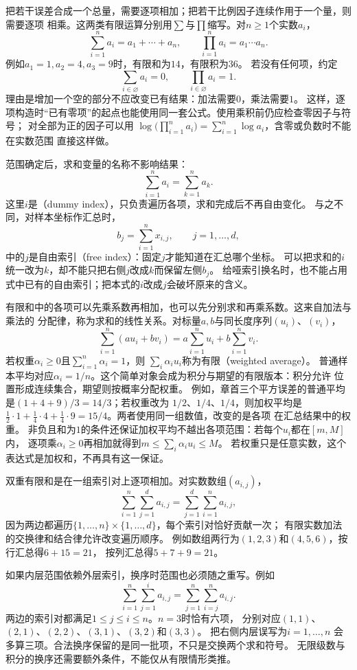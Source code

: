 把若干误差合成一个总量，需要逐项相加；把若干比例因子连续作用于一个量，则需要逐项
相乘。这两类有限运算分别用$\sum$与$\prod$缩写。对$n\geq1$个实数$a_i$，
\[
  \sum_{i=1}^{n}a_i=a_1+\cdots+a_n,\qquad
  \prod_{i=1}^{n}a_i=a_1\cdots a_n.
\]
例如$a_1=1,a_2=4,a_3=9$时，有限和为$14$，有限积为$36$。
若没有任何项，约定
\[
  \sum_{i\in\varnothing}a_i=0,\qquad
  \prod_{i\in\varnothing}a_i=1.
\]
理由是增加一个空的部分不应改变已有结果：加法需要$0$，乘法需要$1$。
这样，逐项构造时“已有零项”的起点也能使用同一套公式。使用乘积前仍应检查零因子与符号；
对全部为正的因子可以用
$\log\bigl(\prod_{i=1}^{n}a_i\bigr)=\sum_{i=1}^{n}\log a_i$，含零或负数时不能在实数范围
直接这样做。

范围确定后，求和变量的名称不影响结果：
\[
  \sum_{i=1}^{n}a_i=\sum_{k=1}^{n}a_k.
\]
这里$i$是（dummy index），只负责遍历各项，求和完成后不再自由变化。
与之不同，对样本坐标作汇总时，
\[
  b_j=\sum_{i=1}^{n}x_{i,j},\qquad j=1,\ldots,d,
\]
中的$j$是自由索引（free index）：固定$j$才能知道在汇总哪个坐标。
可以把求和的$i$统一改为$k$，却不能只把右侧$j$改成$k$而保留左侧$b_j$。
给哑索引换名时，也不能占用式中已有的自由索引；把本式的$i$改成$j$会破坏原来的含义。

有限和中的各项可以先乘系数再相加，也可以先分别求和再乘系数。这来自加法与乘法的
分配律，称为求和的线性关系。对标量$a,b$与同长度序列$(u_i)$、$(v_i)$，
\[
  \sum_{i=1}^{n}(au_i+bv_i)
  =
  a\sum_{i=1}^{n}u_i+b\sum_{i=1}^{n}v_i.
\]
若权重$\alpha_i\geq0$且$\sum_{i=1}^{n}\alpha_i=1$，则
$\sum_i\alpha_i u_i$称为有限（weighted average）。
普通样本平均对应$\alpha_i=1/n$。这个简单对象会成为积分与期望的有限版本：积分允许
位置形成连续集合，期望则按概率分配权重。
例如，章首三个平方误差的普通平均是$(1+4+9)/3=14/3$；若权重改为
$1/2$、$1/4$、$1/4$，则加权平均是
$\frac12\cdot1+\frac14\cdot4+\frac14\cdot9=15/4$。两者使用同一组数值，改变的是各项
在汇总结果中的权重。
非负且和为$1$的条件还保证加权平均不越出各项范围：若每个$u_i$都在$[m,M]$内，
逐项乘$\alpha_i\geq0$再相加就得到$m\leq\sum_i\alpha_i u_i\leq M$。
若权重只是任意实数，这个表达式是加权和，不再具有这一保证。

双重有限和是在一组索引对上逐项相加。对实数数组$(a_{i,j})$，
\[
  \sum_{i=1}^{n}\sum_{j=1}^{d}a_{i,j}
  =
  \sum_{j=1}^{d}\sum_{i=1}^{n}a_{i,j},
\]
因为两边都遍历$\{1,\ldots,n\}\times\{1,\ldots,d\}$，每个索引对恰好贡献一次；
有限实数加法的交换律和结合律允许改变遍历顺序。
例如数组两行为$(1,2,3)$和$(4,5,6)$，按行汇总得$6+15=21$，
按列汇总得$5+7+9=21$。

如果内层范围依赖外层索引，换序时范围也必须随之重写。例如
\begin{equation}
  \sum_{i=1}^{n}\sum_{j=1}^{i}a_{i,j}
  =
  \sum_{j=1}^{n}\sum_{i=j}^{n}a_{i,j}.
  \label{eq:prelim-triangular-sum}
\end{equation}
两边的索引对都满足$1\leq j\leq i\leq n$。$n=3$时恰有六项，
分别对应$(1,1)$、$(2,1)$、$(2,2)$、$(3,1)$、$(3,2)$和$(3,3)$。
把右侧内层误写为$i=1,\ldots,n$
会多算三项。合法换序保留的是同一批项，不只是交换两个求和符号。
无限级数与积分的换序还需要额外条件，不能仅从有限情形类推。

